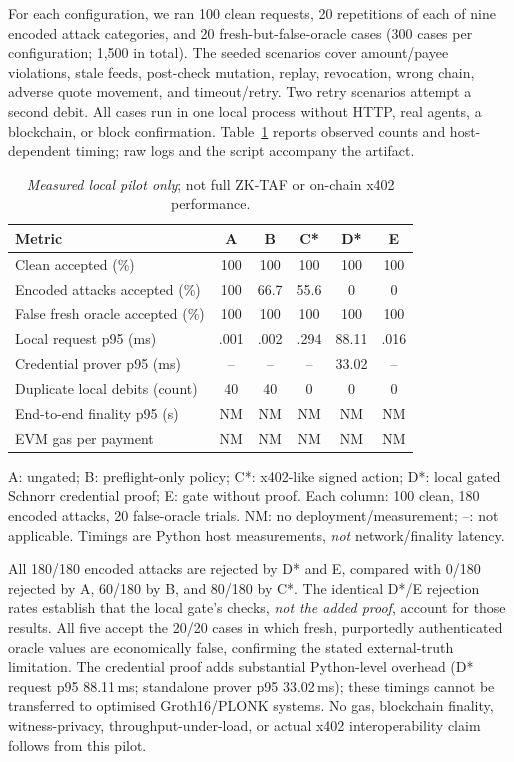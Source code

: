 \documentclass[conference]{IEEEtran}
\begin{document}
For each configuration, we ran 100 clean requests, 20 repetitions of each of nine encoded attack categories, and 20 fresh-but-false-oracle cases (300 cases per configuration; 1,500 in total). The seeded scenarios cover amount/payee violations, stale feeds, post-check mutation, replay, revocation, wrong chain, adverse quote movement, and timeout/retry. Two retry scenarios attempt a second debit. All cases run in one local process without HTTP, real agents, a blockchain, or block confirmation. Table~\ref{tab:results} reports observed counts and host-dependent timing; raw logs and the script accompany the artifact.

\begin{table}[t]
\caption{\emph{Measured local pilot only}; not full ZK-TAF or on-chain x402 performance.}
\label{tab:results}
\centering\footnotesize
\setlength{\tabcolsep}{2.7pt}
\begin{tabular}{@{}lccccc@{}}
\toprule
Metric & A & B & C* & D* & E \\
\midrule
Clean accepted (\%) & 100 & 100 & 100 & 100 & 100 \\
Encoded attacks accepted (\%) & 100 & 66.7 & 55.6 & 0 & 0 \\
False fresh oracle accepted (\%) & 100 & 100 & 100 & 100 & 100 \\
Local request p95 (ms) & .001 & .002 & .294 & 88.11 & .016 \\
Credential prover p95 (ms) & -- & -- & -- & 33.02 & -- \\
Duplicate local debits (count) & 40 & 40 & 0 & 0 & 0 \\
End-to-end finality p95 (s) & NM & NM & NM & NM & NM \\
EVM gas per payment & NM & NM & NM & NM & NM \\
\bottomrule
\end{tabular}
\vspace{2pt}
\begin{minipage}{\columnwidth}\scriptsize
A: ungated; B: preflight-only policy; C*: x402-like signed action; D*: local gated Schnorr credential proof; E: gate without proof. Each column: 100 clean, 180 encoded attacks, 20 false-oracle trials. NM: no deployment/measurement; --: not applicable. Timings are Python host measurements, \emph{not} network/finality latency.\end{minipage}
\end{table}

All 180/180 encoded attacks are rejected by D* and E, compared with 0/180 rejected by A, 60/180 by B, and 80/180 by C*. The identical D*/E rejection rates establish that the local gate's checks, \emph{not the added proof}, account for those results. All five accept the 20/20 cases in which fresh, purportedly authenticated oracle values are economically false, confirming the stated external-truth limitation. The credential proof adds substantial Python-level overhead (D* request p95 88.11\,ms; standalone prover p95 33.02\,ms); these timings cannot be transferred to optimised Groth16/PLONK systems. No gas, blockchain finality, witness-privacy, throughput-under-load, or actual x402 interoperability claim follows from this pilot.
\end{document}
